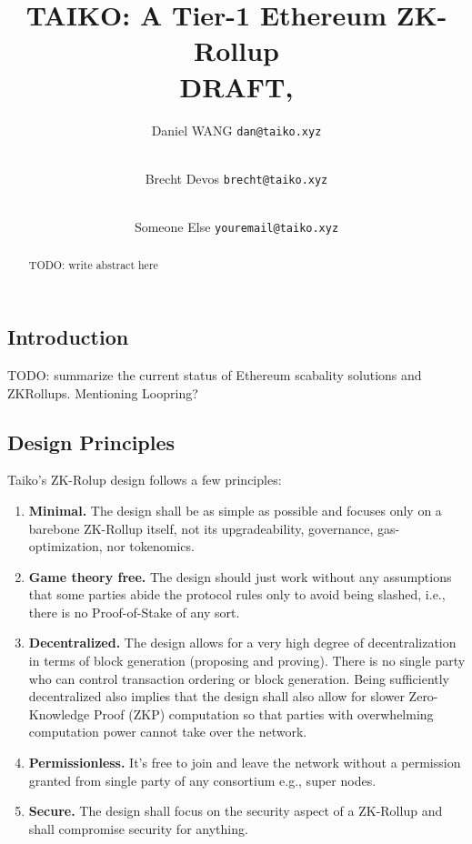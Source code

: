 \documentclass[9pt,oneside]{amsart}
\title[TAIKO: A Tier-1 Ethereum ZK-Rollup\\ \smaller
\textbf{{DRAFT}}]{TAIKO: A Tier-1 Ethereum ZK-Rollup \\ \smaller \textbf{{DRAFT, \thedate}}}
\author{
  Daniel WANG \texttt{dan@taiko.xyz}
  \and \\
  Brecht Devos \texttt{brecht@taiko.xyz}
   \and \\
  Someone Else \texttt{youremail@taiko.xyz}
}
\begin{document}
\pagecolor{pagecolor}

\begin{abstract}
\color{brown}
TODO: write abstract here
\color{black}

\end{abstract}

\maketitle

\setlength{\columnsep}{20pt}
\begin{multicols}{2}


\section{Introduction}

\color{brown}
TODO: summarize the current status of Ethereum scabality solutions and ZKRollups. Mentioning Loopring?

\color{black}

\subsection{Design Principles}

Taiko's ZK-Rolup design follows a few principles:

\begin{enumerate}
\item \textbf{Minimal.} The design shall be as simple as possible and focuses only on a barebone ZK-Rollup itself, not its upgradeability, governance, gas-optimization, nor tokenomics.
\item  \textbf{Game theory free.} The design should just work without any assumptions that some parties abide the protocol rules only to avoid being slashed, i.e., there is no Proof-of-Stake of any sort.
\item \textbf{Decentralized.} The design allows for a very high degree of decentralization in terms of block generation (proposing and proving).  There is no single party who can control transaction ordering or block generation. Being sufficiently decentralized also implies that the design shall also allow for slower Zero-Knowledge Proof (ZKP) computation so that parties with overwhelming computation power cannot take over the network. 
\item \textbf{Permissionless.} It's free to join and leave the network without a permission granted from single party of any consortium e.g., super nodes.
\item \textbf{Secure.} The design shall focus on the security aspect of a ZK-Rollup and shall compromise security for anything.
\end{enumerate}




\end{multicols}
\end{document}
